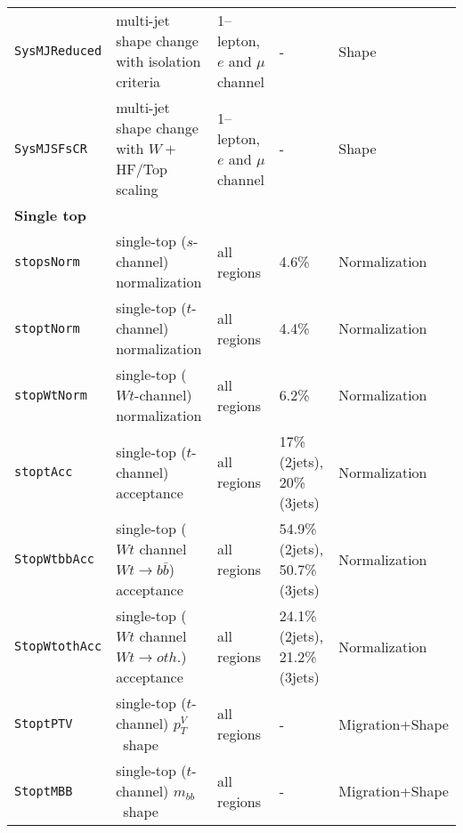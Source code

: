 \begin{table}
{\begin{tabular}{lllll}
      \texttt{SysMJReduced} & multi-jet shape change with isolation criteria & 1--lepton, $e$ and $\mu$ channel & - & Shape \\
      \texttt{SysMJSFsCR} & multi-jet shape change with $W +$HF/Top scaling & 1--lepton, $e$ and $\mu$ channel & - & Shape \\
      {\bfseries Single top}&&&&\\
      \texttt{stopsNorm}    & single-top ($s$-channel) normalization 	&  all regions	& 4.6\%	&Normalization\\
      \texttt{stoptNorm}    & single-top ($t$-channel) normalization 	&  all regions	& 4.4\%	&Normalization\\
      \texttt{stopWtNorm}   & single-top ($Wt$-channel) normalization &  all regions	& 6.2\%	&Normalization\\
      \texttt{stoptAcc}     & single-top ($t$-channel) acceptance 	&  all regions & 17\% (2jets), 20\% (3jets)	&Normalization\\
      \texttt{StopWtbbAcc} 	& single-top ($Wt$ channel $Wt\rightarrow b\bar{b}$) acceptance &  all regions	& 54.9\% (2jets), 50.7\% (3jets)	&Normalization\\
      \texttt{StopWtothAcc} 	& single-top ($Wt$ channel $Wt\rightarrow oth.$) acceptance &  all regions	& 24.1\% (2jets), 21.2\% (3jets)	&Normalization\\
      \texttt{StoptPTV} & single-top ($t$-channel) $p_T^V$\ shape & all regions & - & Migration+Shape\\
      \texttt{StoptMBB} & single-top ($t$-channel) $m_{bb}$\ shape & all regions & - & Migration+Shape\\

\end{tabular}}
\end{table}
